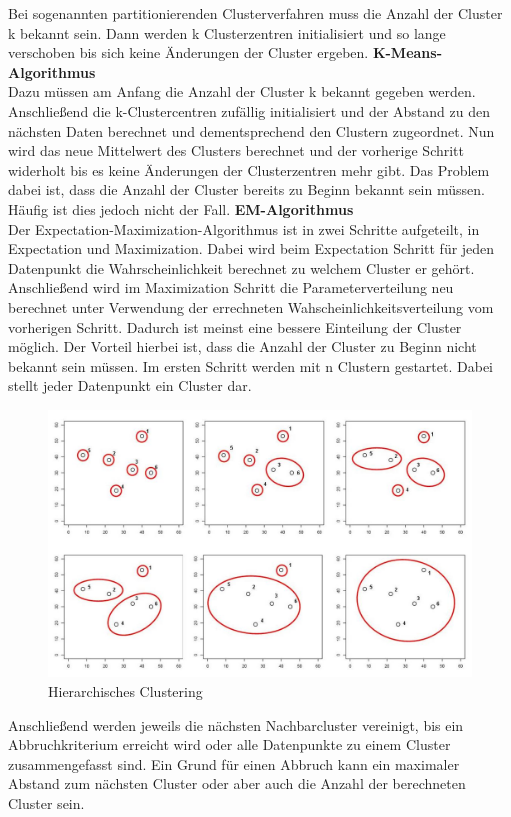 Bei sogenannten partitionierenden Clusterverfahren muss die Anzahl der Cluster k bekannt sein. Dann werden k Clusterzentren initialisiert und so lange verschoben bis sich keine Änderungen der Cluster ergeben. 
\newline
\textbf{K-Means-Algorithmus}\\
Dazu müssen am Anfang die Anzahl der Cluster k bekannt gegeben werden. Anschließend die k-Clustercentren zufällig initialisiert und der Abstand zu den nächsten Daten berechnet und dementsprechend den Clustern zugeordnet. Nun wird das neue Mittelwert des Clusters berechnet und der vorherige Schritt widerholt bis es keine Änderungen der Clusterzentren mehr gibt. Das Problem dabei ist, dass die Anzahl der Cluster bereits zu Beginn bekannt sein müssen. Häufig ist dies jedoch nicht der Fall.
\newline
\textbf{EM-Algorithmus}\\
Der Expectation-Maximization-Algorithmus ist in zwei Schritte aufgeteilt, in Expectation und Maximization. Dabei wird beim Expectation Schritt für jeden Datenpunkt die Wahrscheinlichkeit berechnet zu welchem Cluster er gehört. Anschließend wird im Maximization Schritt die Parameterverteilung neu berechnet unter Verwendung der errechneten Wahscheinlichkeitsverteilung vom vorherigen Schritt. Dadurch ist meinst eine bessere Einteilung der Cluster möglich.
Der Vorteil hierbei ist, dass die Anzahl der Cluster zu Beginn nicht bekannt sein müssen. Im ersten Schritt werden mit n Clustern gestartet. Dabei stellt jeder Datenpunkt ein Cluster dar.
 \begin{figure}[h]
	\includegraphics[width=1\linewidth]{Bilder/hierarchisches_clustering}
	\caption{Hierarchisches Clustering}\label{hierarchisches_clustering}
\end{figure}  
 Anschließend werden jeweils die nächsten Nachbarcluster vereinigt, bis ein Abbruchkriterium erreicht wird oder alle Datenpunkte zu einem Cluster zusammengefasst sind. Ein Grund für einen Abbruch kann ein maximaler Abstand zum nächsten Cluster oder aber auch die Anzahl der berechneten Cluster sein.


